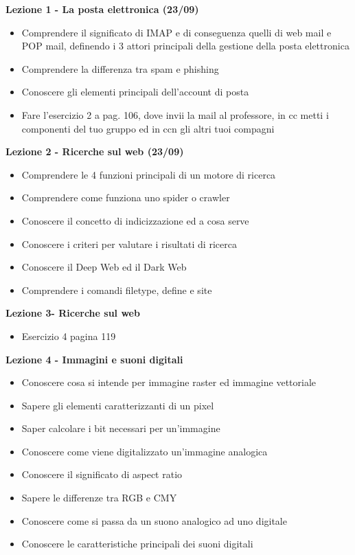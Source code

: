 \documentclass{article}
\begin{document}
	\begin{center}
		\textbf{Lezione 1 - La posta elettronica (23/09)}
		\begin{itemize}
			\item Comprendere il significato di IMAP e di conseguenza quelli di web mail e POP mail, definendo i 3 attori principali della gestione della posta elettronica
			\item Comprendere la differenza tra spam e phishing
			\item Conoscere gli elementi principali dell'account di posta
			\item Fare l'esercizio 2 a pag. 106, dove invii la mail al professore, in cc metti i componenti del tuo gruppo ed in ccn gli altri tuoi compagni
		\end{itemize}
		\textbf{Lezione 2 - Ricerche sul web (23/09)}
		\begin{itemize}
			\item Comprendere le 4 funzioni principali di un motore di ricerca
			\item Comprendere come funziona uno spider o crawler
			\item Conoscere il concetto di indicizzazione ed a cosa serve
			\item Conoscere i criteri per valutare i risultati di ricerca
			\item Conoscere il Deep Web ed il Dark Web
			\item Comprendere i comandi filetype, define e site
		\end{itemize}
		\textbf{Lezione 3- Ricerche sul web}
		\begin{itemize}
			\item Esercizio 4 pagina 119
		\end{itemize}
	
		\begin{center}
			\textbf{Lezione 4 - Immagini e suoni digitali}
			\begin{itemize}
				\item Conoscere cosa si intende per immagine raster ed immagine vettoriale
				\item Sapere gli elementi caratterizzanti di un pixel
				\item Saper calcolare i bit necessari per un'immagine
				\item Conoscere come viene digitalizzato un'immagine analogica
				\item Conoscere il significato di aspect ratio 
				\item Sapere le differenze tra RGB e CMY
				\item Conoscere come si passa da un suono analogico ad uno digitale
				\item Conoscere le caratteristiche principali dei suoni digitali
			\end{itemize}
		\end{center}
	\end{center}
\end{document}
